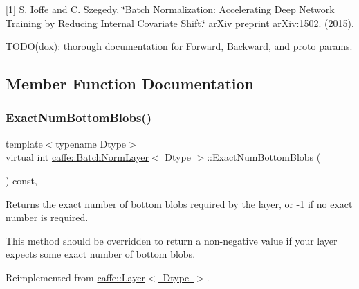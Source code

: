 \mbox{[}1\mbox{]} S. Ioffe and C. Szegedy, \char`\"{}\+Batch Normalization\+: Accelerating Deep Network
    Training by Reducing Internal Covariate Shift.\char`\"{} ar\+Xiv preprint ar\+Xiv\+:1502. (2015).

T\+O\+D\+O(dox)\+: thorough documentation for Forward, Backward, and proto params. 

\subsection{Member Function Documentation}
\mbox{\label{classcaffe_1_1_batch_norm_layer_a5b87980f25eea544ebff916586c870e6}} 
\subsubsection{\texorpdfstring{Exact\+Num\+Bottom\+Blobs()}{ExactNumBottomBlobs()}\hspace{0.1cm}{\footnotesize\ttfamily [1/2]}}
{\footnotesize\ttfamily template$<$typename Dtype$>$ \\
virtual int \mbox{\hyperlink{classcaffe_1_1_batch_norm_layer}{caffe\+::\+Batch\+Norm\+Layer}}$<$ Dtype $>$\+::Exact\+Num\+Bottom\+Blobs (\begin{DoxyParamCaption}{ }\end{DoxyParamCaption}) const\hspace{0.3cm}{\ttfamily [inline]}, {\ttfamily [virtual]}}



Returns the exact number of bottom blobs required by the layer, or -\/1 if no exact number is required. 

This method should be overridden to return a non-\/negative value if your layer expects some exact number of bottom blobs. 

Reimplemented from \mbox{\hyperlink{classcaffe_1_1_layer_a8e5ee0494d85f5f55fc4396537cbc60f}{caffe\+::\+Layer$<$ Dtype $>$}}.

\mbox{\label{classcaffe_1_1_batch_norm_layer_a5b87980f25eea544ebff916586c870e6}} 
